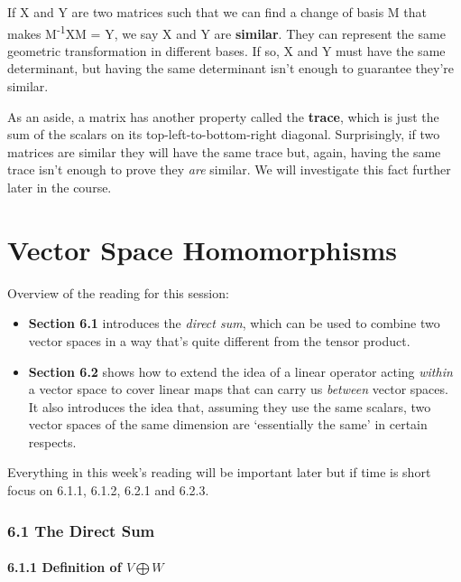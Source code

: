 \documentclass[oneside,english]{amsbook}
\numberwithin{section}{chapter}
\theoremstyle{plain}
\theoremstyle{definition}
\begin{document}
If X and Y are two matrices such that we can find a change of basis M
that makes M\textsuperscript{-1}XM = Y, we say X and Y are
\textbf{similar}. They can represent the same geometric transformation
in different bases. If so, X and Y must have the same determinant, but
having the same determinant isn't enough to guarantee they're similar.

As an aside, a matrix has another property called the \textbf{trace},
which is just the sum of the scalars on its top-left-to-bottom-right
diagonal. Surprisingly, if two matrices are similar they will have the
same trace but, again, having the same trace isn't enough to prove they
\emph{are} similar. We will investigate this fact further later in the
course.

\chapter{Vector Space Homomorphisms}

Overview of the reading for this session:

\begin{itemize}
	\item
	\textbf{Section 6.1} introduces the \emph{direct sum}, which can be
	used to combine two vector spaces in a way that's quite different from
	the tensor product.
	\item
	\textbf{Section 6.2} shows how to extend the idea of a linear operator
	acting \emph{within} a vector space to cover linear maps that can
	carry us \emph{between} vector spaces. It also introduces the idea
	that, assuming they use the same scalars, two vector spaces of the
	same dimension are `essentially the same' in certain respects.
\end{itemize}

Everything in this week's reading will be important later but if time is
short focus on 6.1.1, 6.1.2, 6.2.1 and 6.2.3.

\subsection{6.1 The Direct Sum}\label{the-direct-sum}

\subsubsection{\texorpdfstring{6.1.1 Definition of
		\(V\bigoplus W\)}{6.1.1 Definition of V\textbackslash bigoplus W}}\label{definition-of-vbigoplus-w}
\end{document}
